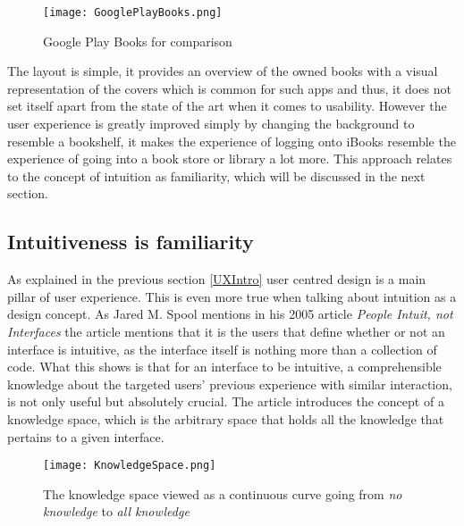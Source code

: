 \begin{figure}[H]
\centering
\texttt{[image: GooglePlayBooks.png]}
\caption{Google Play Books for comparison}
\end{figure}
The layout is simple, it provides an overview of the owned books with a visual representation of the 
covers which is common for such apps and thus, it does not set itself apart from the state of the art when it comes to usability. However the user experience is 
greatly improved simply by changing the background to resemble a bookshelf, it makes the experience of logging onto iBooks resemble the experience of going into a book store or library a lot more. This approach relates to the concept of 
intuition as familiarity, which will be discussed in the next section.    
\subsection{Intuitiveness is familiarity} \label{IntuIsFam}
As explained in the previous section \ref{UXIntro} user centred design is a main 
pillar of user experience. This is even more true when talking about intuition as 
a design concept. As Jared M. Spool mentions in his 2005 article \textit{People 
Intuit, not Interfaces}\cite{JaredMSpool} the article mentions that it is the 
users that define whether or not an interface is intuitive, as the interface 
itself is nothing more than a collection of code. What this shows is that for an 
interface to be intuitive, a comprehensible knowledge about the targeted users' 
previous experience with similar interaction, is not only useful but absolutely 
crucial. The article introduces the concept of a knowledge space, which is the 
arbitrary space that holds all the knowledge that pertains to a given interface. 

\begin{figure}[H]
\centering
\texttt{[image: KnowledgeSpace.png]}
\caption{The knowledge space viewed as a continuous curve going from \textit{no 
knowledge} to \textit{all knowledge} \cite{JaredMSpool}}
\label{fig:Knowledge}
\end{figure}

